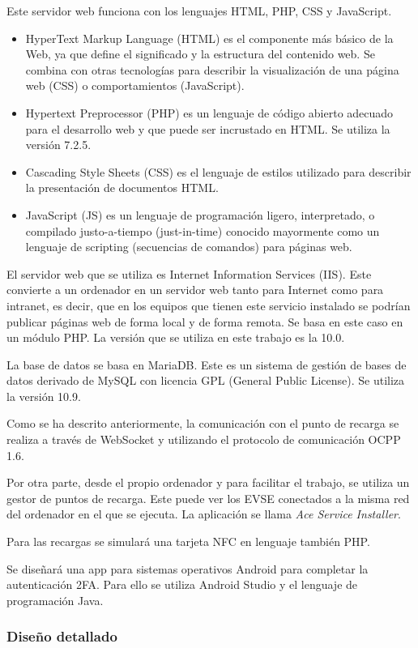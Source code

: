 \documentclass[12pt,a4paper,onecolumn,oneside]{report}
\begin{document}
Este servidor web funciona con los lenguajes HTML, PHP, CSS y JavaScript.
\begin{itemize} 
\item HyperText Markup Language (HTML) es el componente más básico de la Web, ya que define el significado y la estructura del contenido web. Se combina con otras tecnologías para describir la visualización de una página web (CSS) o comportamientos (JavaScript).
\item Hypertext Preprocessor (PHP) es un lenguaje de código abierto adecuado para el desarrollo web y que puede ser incrustado en HTML. Se utiliza la versión 7.2.5.
\item Cascading Style Sheets (CSS) es el lenguaje de estilos utilizado para describir la presentación de documentos HTML.
\item JavaScript (JS) es un lenguaje de programación ligero, interpretado, o compilado justo-a-tiempo (just-in-time) conocido mayormente como un lenguaje de scripting (secuencias de comandos) para páginas web.
\end{itemize}

El servidor web que se utiliza es Internet Information Services (IIS). Este convierte a un ordenador en un servidor web tanto para Internet como para intranet, es decir, que en los equipos que tienen este servicio instalado se podrían publicar páginas web de forma local y de forma remota. Se basa en este caso en un módulo PHP. La versión que se utiliza en este trabajo es la 10.0.

La base de datos se basa en MariaDB. Este es un sistema de gestión de bases de datos derivado de MySQL con licencia GPL (General Public License). Se utiliza la versión 10.9.

Como se ha descrito anteriormente, la comunicación con el punto de recarga se realiza a través de WebSocket y utilizando el protocolo de comunicación OCPP 1.6.

Por otra parte, desde el propio ordenador y para facilitar el trabajo, se utiliza un gestor de puntos de recarga. Este puede ver los EVSE conectados a la misma red del ordenador en el que se ejecuta. La aplicación se llama \textit{Ace Service Installer}.

Para las recargas se simulará una tarjeta NFC en lenguaje también PHP. 

Se diseñará una app para sistemas operativos Android para completar la autenticación 2FA. Para ello se utiliza Android Studio y el lenguaje de programación Java.


\subsubsection{Diseño detallado}
\end{document}

